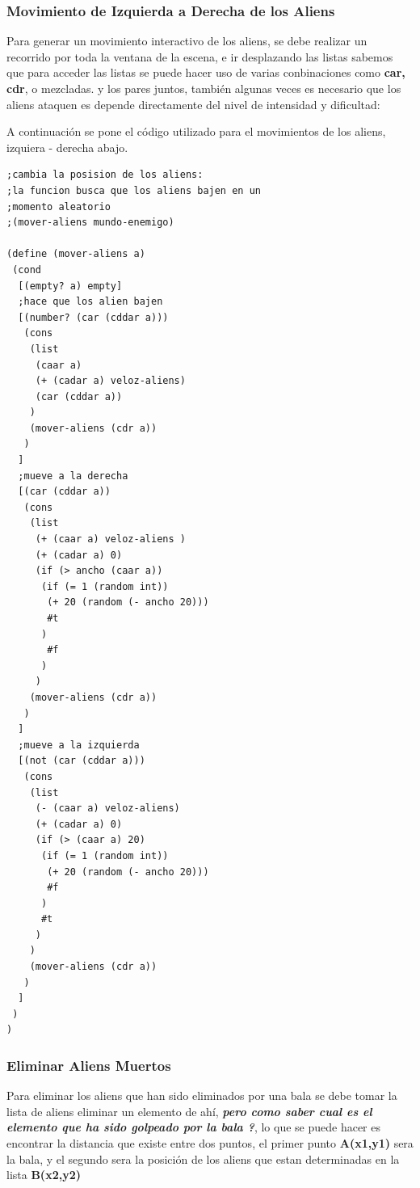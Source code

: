 \documentclass[a4paper]{article} %
\begin{document}
\subsubsection{Movimiento de Izquierda a Derecha de los Aliens}
Para generar un movimiento interactivo de los aliens, se debe realizar un recorrido por toda la ventana de la escena,  e ir desplazando las listas sabemos que para acceder las listas se puede hacer uso de varias conbinaciones como \textbf{car, cdr}, o mezcladas. y los pares juntos, también algunas veces es necesario que los aliens ataquen es depende directamente del nivel de intensidad y dificultad:

A continuación se pone el código utilizado para el movimientos de los aliens, izquiera - derecha abajo.

\begin{lstlisting}
;cambia la posision de los aliens:
;la funcion busca que los aliens bajen en un
;momento aleatorio
;(mover-aliens mundo-enemigo)

(define (mover-aliens a)
 (cond
  [(empty? a) empty]
  ;hace que los alien bajen
  [(number? (car (cddar a))) 
   (cons
    (list 
     (caar a)
     (+ (cadar a) veloz-aliens)
     (car (cddar a))
    )
    (mover-aliens (cdr a))
   )
  ]
  ;mueve a la derecha
  [(car (cddar a)) 
   (cons  
    (list     
     (+ (caar a) veloz-aliens )
     (+ (cadar a) 0)
     (if (> ancho (caar a)) 
      (if (= 1 (random int))
       (+ 20 (random (- ancho 20)))
       #t
      )       
       #f
      )      
     )                      
    (mover-aliens (cdr a))
   )
  ]
  ;mueve a la izquierda
  [(not (car (cddar a))) 
   (cons  
    (list 
     (- (caar a) veloz-aliens)
     (+ (cadar a) 0)
     (if (> (caar a) 20)
      (if (= 1 (random int))
       (+ 20 (random (- ancho 20)))
       #f
      )
      #t
     )
    )                  
    (mover-aliens (cdr a))
   )
  ]
 )  
)
\end{lstlisting}
\subsubsection{Eliminar Aliens Muertos}
Para eliminar los aliens que han sido eliminados por una bala se debe tomar la lista de aliens  eliminar un elemento de ahí, \textbf{\emph{pero como saber cual es el elemento que ha sido golpeado por la bala ?}}, lo que se puede hacer es encontrar la distancia que existe entre dos puntos, el primer punto \textbf{A(x1,y1)} sera la bala, y el segundo sera la posición de los aliens que estan determinadas en la lista \textbf{B(x2,y2)}
\end{document}
